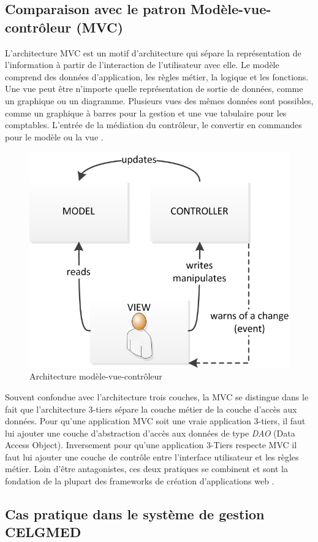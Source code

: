 \subsection{Comparaison avec le patron Modèle-vue-contrôleur (MVC)}

L'architecture MVC est un motif d'architecture qui sépare la représentation de l'information à partir de l'interaction de l'utilisateur avec elle. Le modèle comprend des données d'application, les règles métier, la logique et les fonctions. Une vue peut être n'importe quelle représentation de sortie de données, comme un graphique ou un diagramme. Plusieurs vues des mêmes données sont possibles, comme un graphique à barres pour la gestion et une vue tabulaire pour les comptables. L'entrée de la médiation du contrôleur, le convertir en commandes pour le modèle ou la vue \cite{mvc}. 

\begin{figure}[h]
\begin{center}
    \includegraphics[scale=1.0]{img/mvc}
    \caption{Architecture modèle-vue-contrôleur}
	\label{3-tier}
\end{center}
\end{figure}

Souvent confondue avec l'architecture trois couches, la MVC se distingue dans le fait que l'architecture 3-tiers sépare la couche métier de la couche d'accès aux données. Pour qu'une application MVC soit une vraie application 3-tiers, il faut lui ajouter une couche d'abstraction d'accès aux données de type \textit{DAO} (Data Access Object). Inversement pour qu'une application 3-Tiers respecte MVC il faut lui ajouter une couche de contrôle entre l'interface utilisateur et les règles métier. Loin d'être antagonistes, ces deux pratiques se combinent et sont la fondation de la plupart des frameworks de création d'applications web \cite{mvc-3-tier}.

\subsection{Cas pratique dans le système de gestion CELGMED}